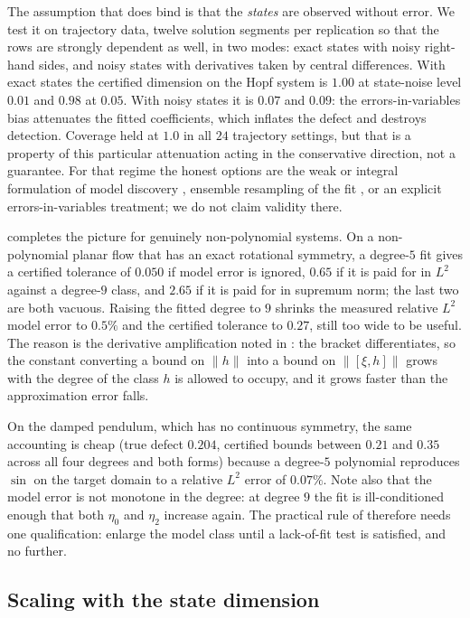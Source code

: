The assumption that does bind is that the \emph{states} are observed without
error. We test it on trajectory data, twelve solution segments per replication
so that the rows are strongly dependent as well, in two modes: exact states
with noisy right-hand sides, and noisy states with derivatives taken by
central differences. With exact states the certified dimension on the Hopf
system is $1.00$ at state-noise level $0.01$ and $0.98$ at $0.05$. With noisy
states it is $0.07$ and $0.09$: the errors-in-variables bias attenuates the
fitted coefficients, which inflates the defect and destroys detection.
Coverage held at $1.0$ in all $24$ trajectory settings, but that is a property
of this particular attenuation acting in the conservative direction, not a
guarantee. For that regime the honest options are the weak or integral
formulation of model discovery \citep{messenger2021weak}, ensemble resampling
of the fit \citep{fasel2022ensemble}, or an explicit errors-in-variables
treatment; we do not claim validity there.

 completes the picture for genuinely non-polynomial
systems. On a non-polynomial planar flow that has an exact rotational
symmetry, a degree-$5$ fit gives a certified tolerance of $0.050$ if model
error is ignored, $0.65$ if it is paid for in $L^2$ against a degree-$9$
class, and $2.65$ if it is paid for in supremum norm; the last two are both
vacuous. Raising the fitted degree to $9$ shrinks the measured relative $L^2$
model error to $0.5\%$ and the certified tolerance to $0.27$, still too wide
to be useful. The reason is the derivative amplification noted in
: the bracket differentiates, so the constant converting
a bound on $\|h\|$ into a bound on $\|[\xi,h]\|$ grows with the degree of the
class $h$ is allowed to occupy, and it grows faster than the approximation
error falls.

On the damped pendulum, which has no continuous symmetry, the same accounting
is cheap (true defect $0.204$, certified bounds between $0.21$ and $0.35$
across all four degrees and both forms) because a degree-$5$ polynomial
reproduces $\sin$ on the target domain to a relative $L^2$ error of $0.07\%$.
Note also that the model error is not monotone in the degree: at degree $9$
the fit is ill-conditioned enough that both $\eta_0$ and $\eta_2$ increase
again. The practical rule of  therefore needs one
qualification: enlarge the model class until a lack-of-fit test is satisfied,
and no further.

\subsection{Scaling with the state dimension}
\label{sec:scaling}

